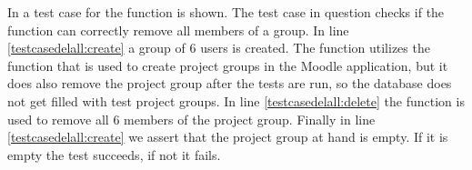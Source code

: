 \begin{comment}

\end{comment}
In  a test case for the function  is shown.
The test case in question checks if the function can correctly remove all members of a group. 
In line \ref{testcasedelall:create} a group of $6$ users is created.
The function  utilizes the function that is used to create project groups in the Moodle application, but it does also remove the project group after the tests are run, so the database does not get filled with test project groups.
In line \ref{testcasedelall:delete} the function  is used to remove all $6$ members of the project group.
Finally in line \ref{testcasedelall:create} we assert that the project group at hand is empty.
If it is empty the test succeeds, if not it fails.


